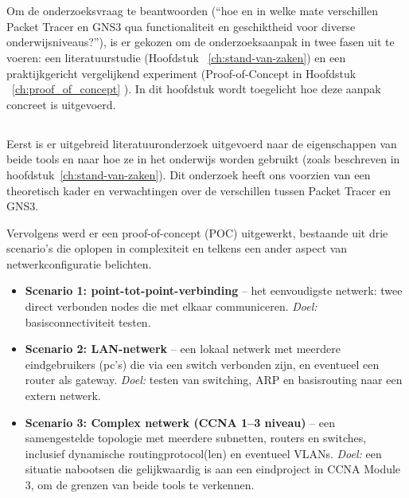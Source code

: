 
\chapter{}%
\label{ch:methodologie}

Om de onderzoeksvraag te beantwoorden (“hoe en in welke mate verschillen Packet Tracer en GNS3 qua functionaliteit en geschiktheid voor diverse onderwijsniveaus?”), is er gekozen om de onderzoeksaanpak in twee fasen uit te voeren: een literatuurstudie (Hoofdstuk ~\ref{ch:stand-van-zaken}) en een praktijkgericht vergelijkend experiment (Proof-of-Concept in Hoofdstuk ~\ref{ch:proof_of_concept} ). In dit hoofdstuk wordt toegelicht hoe deze aanpak concreet is uitgevoerd.

\section{}
\label{sec:onderzoeksopzet}

Eerst is er uitgebreid literatuuronderzoek uitgevoerd naar de eigenschappen van beide tools en naar hoe ze in het onderwijs worden gebruikt (zoals beschreven in hoofdstuk~\ref{ch:stand-van-zaken}). Dit onderzoek heeft ons voorzien van een theoretisch kader en verwachtingen over de verschillen tussen Packet Tracer en GNS3.

\vspace{0.5cm}

Vervolgens werd er een proof-of-concept (POC) uitgewerkt, bestaande uit drie scenario’s die oplopen in complexiteit en telkens een ander aspect van netwerkconfiguratie belichten.

\begin{itemize}
    \item \textbf{Scenario 1: point-tot-point-verbinding} – het eenvoudigste netwerk: twee direct verbonden nodes die met elkaar communiceren. \textit{Doel:} basisconnectiviteit testen.
    
    \item \textbf{Scenario 2: LAN-netwerk} – een lokaal netwerk met meerdere eindgebruikers (pc’s) die via een switch verbonden zijn, en eventueel een router als gateway. \textit{Doel:} testen van switching, ARP en basisrouting naar een extern netwerk.
    
    \item \textbf{Scenario 3: Complex netwerk (CCNA 1–3 niveau)} – een samengestelde topologie met meerdere subnetten, routers en switches, inclusief dynamische routingprotocol(len) en eventueel VLANs. \textit{Doel:} een situatie nabootsen die gelijkwaardig is aan een eindproject in CCNA Module 3, om de grenzen van beide tools te verkennen.
\end{itemize}

